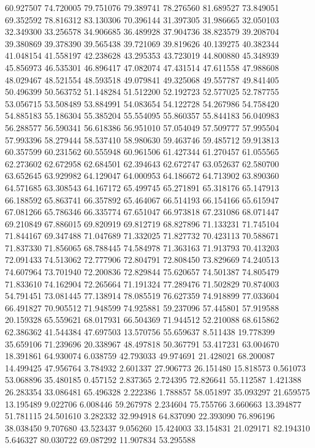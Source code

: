 60.927507
74.720005
79.751076
79.389741
78.276560
81.689527
73.849051
69.352592
78.816312
83.130306
70.396144
31.397305
31.986665
32.050103
32.349300
33.256578
34.906685
36.489928
37.904736
38.823579
39.208704
39.380869
39.378390
39.565438
39.721069
39.819626
40.139275
40.382344
41.048154
41.558197
42.238628
43.295353
43.723019
44.800880
45.348939
45.856973
46.535301
46.896417
47.082074
47.431514
47.611558
47.988608
48.029467
48.521554
48.593518
49.079841
49.325068
49.557787
49.841405
50.496399
50.563752
51.148284
51.512200
52.192723
52.577025
52.787755
53.056715
53.508489
53.884991
54.083654
54.122728
54.267986
54.758420
54.885183
55.186304
55.385204
55.554095
55.860357
55.844183
56.040983
56.288577
56.590341
56.618386
56.951010
57.054049
57.509777
57.995504
57.993396
58.279444
58.537410
58.980630
59.463746
59.485712
59.913813
60.357599
60.231562
60.555948
60.961506
61.427344
61.270457
61.055565
62.273602
62.672958
62.684501
62.394643
62.672747
63.052637
62.580700
63.652645
63.929982
64.129047
64.000953
64.186672
64.713902
63.890360
64.571685
63.308543
64.167172
65.499745
65.271891
65.318176
65.147913
66.188592
65.863741
66.357892
65.464067
66.514193
66.154166
65.615947
67.081266
65.786346
66.335774
67.651047
66.973818
67.231086
68.071447
69.210849
67.886015
69.820919
69.812719
68.827896
71.133231
71.745104
71.844167
69.347488
71.047689
71.332025
71.827732
70.423113
70.588671
71.837330
71.856065
68.788445
74.584978
71.363163
71.913793
70.413203
72.091433
74.513062
72.777906
72.804791
72.808450
73.829669
74.240513
74.607964
73.701940
72.200836
72.829844
75.620657
74.501387
74.805479
71.833610
74.162904
72.265664
71.191324
77.289476
71.502829
70.874003
54.791451
73.081445
77.138914
78.085519
76.627359
74.918899
77.033604
66.491827
70.905512
71.948599
74.925881
59.237096
57.445801
57.919588
20.159328
65.559621
68.017931
66.504369
71.944512
52.210088
68.615862
62.386362
41.544384
47.697503
13.570756
55.659637
8.511438
19.778399
35.659106
71.239696
20.338967
48.497818
50.367791
53.417231
63.004670
18.391861
64.930074
6.038759
42.793033
49.974691
21.428021
68.200087
14.499425
47.956764
3.784932
2.601337
27.906773
26.151480
15.818573
0.561073
53.068896
35.480185
0.457152
2.837365
2.724395
72.826641
55.112587
1.421388
26.283354
33.086481
65.496328
2.222386
1.788857
58.051897
35.093297
21.659575
13.195489
9.022706
6.008446
59.267978
2.234604
75.755766
3.660663
13.394877
51.781115
24.501610
3.282332
32.994918
64.837090
22.393090
76.896196
38.038450
9.707680
43.523437
9.056260
15.424003
33.154831
21.029171
82.194310
5.646327
80.030722
69.087292
11.907834
53.295588
